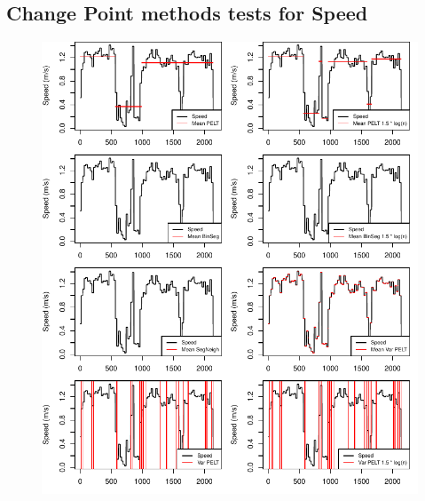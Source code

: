 \begin{appendix}
\section{Change Point methods tests for Speed}\label{Acptest}
\begin{figure}
\includegraphics{img/R_comparisonMethodsSpeed2.pdf}
\end{figure}




\end{appendix}